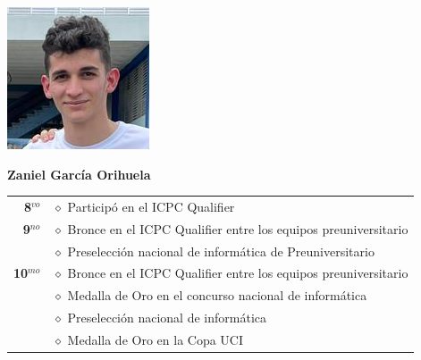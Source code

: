 \begin{minipage}{0.2\textwidth}
	\includegraphics[width=\linewidth]{img/concursantes/zaniel.png} %
\end{minipage}
\hfill
\begin{minipage}{0.7\textwidth}
	\textbf{Zaniel García Orihuela}
	
	\vspace*{0.1in}
	\begin{tabular}{rl}
		
		\textbf{8$^{vo}$} 
		& $\diamond$ Participó en el ICPC Qualifier \\
		
		\textbf{9$^{no}$} 
		& $\diamond$ Bronce en el ICPC Qualifier entre los equipos preuniversitario  \\
		& $\diamond$ Preselección nacional de informática de Preuniversitario \\
		
		\textbf{10$^{mo}$} 
		& $\diamond$ Bronce en el ICPC Qualifier entre los equipos preuniversitario  \\
		& $\diamond$ Medalla de Oro en el concurso nacional de informática\\
		& $\diamond$ Preselección nacional de informática  \\
		& $\diamond$ Medalla de Oro en la Copa UCI  \\
		
		
		
	\end{tabular}
\end{minipage}

